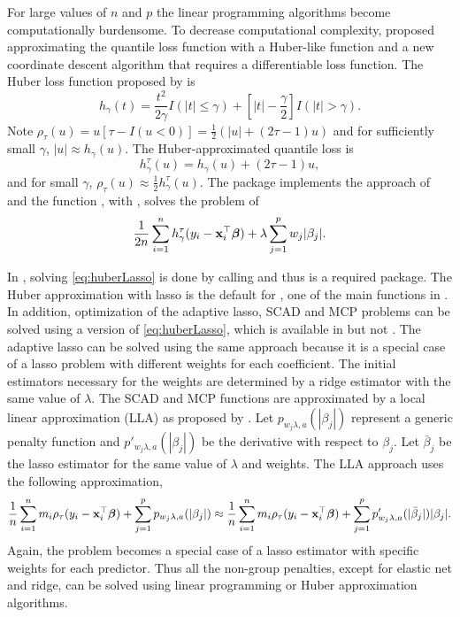 For large values of \(n\) and \(p\) the linear programming algorithms become computationally burdensome. To decrease computational complexity, \citet{huber_cd} proposed approximating the quantile loss function with a Huber-like function and a new coordinate descent algorithm that requires a differentiable loss function. The Huber loss function proposed by \citet{huber1964} is
\[
h_\gamma(t) = \frac{t^2}{2\gamma}I(|t| \leq \gamma)+\left[|t|-\frac{\gamma}{2}\right]I(|t|>\gamma).
\]
Note \(\rho_\tau(u) = u[\tau-I(u<0)]=\frac{1}{2}(|u|+(2\tau-1)u)\) and for sufficiently small \(\gamma\), \(|u| \approx h_\gamma(u)\). The Huber-approximated quantile loss is
\begin{equation}
h_{\gamma}^{\tau}(u) = h_\gamma(u) + (2\tau-1)u,
\label{eq:huberQuantile}
\end{equation}
and for small \(\gamma\), \(\rho_\tau(u) \approx \frac{1}{2}h_{\gamma}^{\tau}(u)\). The package  implements the approach of \citet{huber_cd} and the function , with , solves the problem of
\begin{equation}
\frac{1}{2n} \sum_{i=1}^n h_{\gamma}^{\tau}(y_i - {\bf x}_i^\top\bm \beta) +  \lambda \sum_{j=1}^p w_j|\beta_j|.
\label{eq:huberLasso}
\end{equation}

In , solving \eqref{eq:huberLasso} is done by calling  and thus  is a required package. The Huber approximation with lasso is the default for , one of the main functions in . In addition, optimization of the adaptive lasso, SCAD and MCP problems can be solved using a version of \eqref{eq:huberLasso}, which is available in  but not . The adaptive lasso can be solved using the same approach because it is a special case of a lasso problem with different weights for each coefficient. The initial estimators necessary for the weights are determined by a ridge estimator with the same value of \(\lambda\). The SCAD and MCP functions are approximated by a local linear approximation (LLA) as proposed by \citet{lla}. Let \(p_{w_j\lambda,a}(|\beta_j|)\) represent a generic penalty function and \(p'_{w_j\lambda,a}(|\beta_j|)\) be the derivative with respect to \(\beta_j\). Let \(\bar{\beta}_j\) be the lasso estimator for the same value of \(\lambda\) and weights. The LLA approach uses the following approximation,
\begin{equation}
\frac{1}{n} \sum_{i=1}^n m_i \rho_\tau(y_i-{\bf x}_i^\top\bm \beta) + \sum_{j=1}^p p_{w_j\lambda,a}(|\beta_j|) \approx \frac{1}{n} \sum_{i=1}^n m_i \rho_\tau(y_i-{\bf x}_i^\top\bm \beta) + \sum_{j=1}^p p'_{w_j\lambda,a}(|\bar{\beta}_j|)|\beta_j|.
\label{eq:lla}
\end{equation}
Again, the problem becomes a special case of a lasso estimator with specific weights for each predictor. Thus all the non-group penalties, except for elastic net and ridge, can be solved using linear programming or Huber approximation algorithms.

